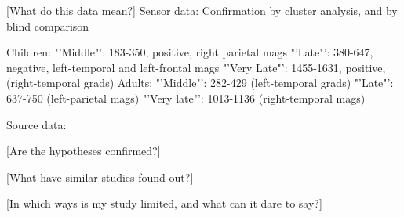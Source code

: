 [What do this data mean?]
Sensor data:
Confirmation by cluster analysis, and by blind comparison

Children:
"'Middle"': 183-350, positive, right parietal mags
"'Late"': 380-647, negative, left-temporal and left-frontal mags
"'Very Late"': 1455-1631, positive, (right-temporal grads)
Adults:
"'Middle"': 282-429 (left-temporal grads)
"'Late"': 637-750 (left-parietal mags)
"'Very late"': 1013-1136 (right-temporal mags)

Source data:


[Are the hypotheses confirmed?]

[What have similar studies found out?]

[In which ways is my study limited, and what can it dare to say?]
